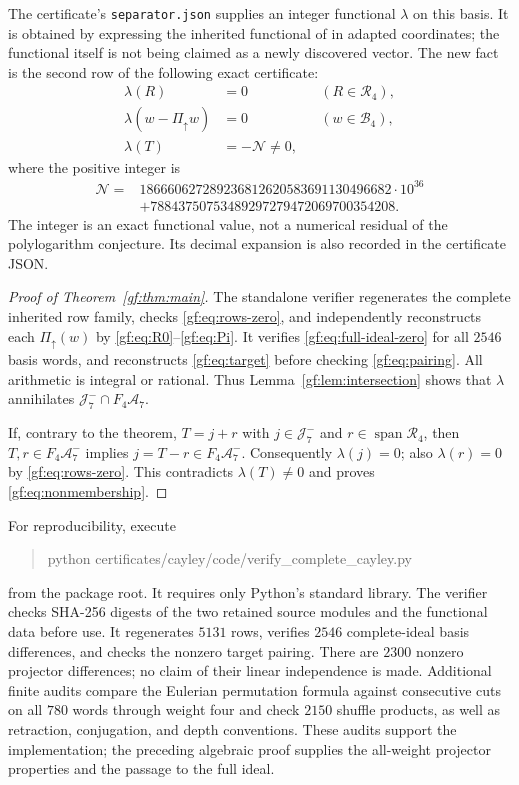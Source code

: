 The certificate's \texttt{separator.json} supplies an integer functional
$\lambda$ on this basis. It is obtained by expressing the inherited
functional of \cite{gf:Bounded} in adapted coordinates; the functional
itself is not being claimed as a newly discovered vector. The new fact
is the second row of the following exact certificate:
\begin{align}
 \lambda(R)&=0 &&(R\in\mathscr R_4),\label{gf:eq:rows-zero}\\
 \lambda(w-\Pi_{\uparrow}w)&=0 &&(w\in\mathcal B_4),
       \label{gf:eq:full-ideal-zero}\\
 \lambda(T)&=-\mathcal N\ne0,\label{gf:eq:pairing}
\end{align}
where the positive integer is
\[
 \begin{aligned}
 \mathcal N={}&186660627289236812620583691130496682\cdot10^{36}\\
              &+78843750753489297279472069700354208.
 \end{aligned}
\]
The integer is an exact functional value, not a numerical residual of the
polylogarithm conjecture. Its decimal expansion is also recorded in the
certificate JSON.

\begin{proof}[Proof of Theorem~\ref{gf:thm:main}]
The standalone verifier regenerates the complete inherited row family,
checks \eqref{gf:eq:rows-zero}, and independently reconstructs each
$\Pi_{\uparrow}(w)$ by \eqref{gf:eq:R0}--\eqref{gf:eq:Pi}. It verifies
\eqref{gf:eq:full-ideal-zero} for all $2546$ basis words, and reconstructs
\eqref{gf:eq:target} before checking \eqref{gf:eq:pairing}. All arithmetic
is integral or rational. Thus Lemma~\ref{gf:lem:intersection} shows that
$\lambda$ annihilates $\mathcal J_7^-\cap F_4\mathcal A_7$.

If, contrary to the theorem, $T=j+r$ with $j\in\mathcal J_7^-$ and
$r\in\operatorname{span}\mathscr R_4$, then $T,r\in F_4\mathcal A_7^-$
implies $j=T-r\in F_4\mathcal A_7^-$. Consequently $\lambda(j)=0$;
also $\lambda(r)=0$ by \eqref{gf:eq:rows-zero}. This contradicts
$\lambda(T)\ne0$ and proves \eqref{gf:eq:nonmembership}.
\end{proof}

For reproducibility, execute
\begin{quote}\ttfamily
python certificates/cayley/code/verify\_complete\_cayley.py
\end{quote}
from the package root. It requires only Python's
standard library. The verifier checks SHA-256 digests of the two retained
source modules and the functional data before use. It regenerates $5131$
rows, verifies $2546$ complete-ideal basis differences, and checks the
nonzero target pairing. There are $2300$ nonzero projector differences;
no claim of their linear independence is made. Additional finite audits
compare the Eulerian permutation formula against consecutive cuts on all
$780$ words through weight four and check $2150$ shuffle products, as
well as retraction, conjugation, and depth conventions. These audits
support the implementation; the preceding algebraic proof supplies the
all-weight projector properties and the passage to the full ideal.

